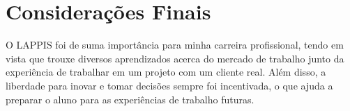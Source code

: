 \chapter[Considerações Finais]{Considerações Finais}
O LAPPIS foi de suma importância para minha carreira profissional, tendo em vista
que trouxe diversos aprendizados acerca do mercado de trabalho junto da experiência
de trabalhar em um projeto com um cliente real. Além disso, a liberdade para inovar
e tomar decisões sempre foi incentivada, o que ajuda a preparar o aluno para as experiências
de trabalho futuras.
